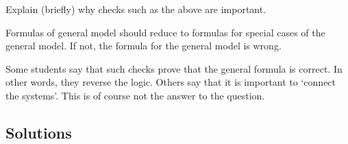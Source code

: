 \begin{exercise}[201904, 1]
  Explain (briefly) why checks such as the above are important.
\begin{solution}
    Formulas of general model should reduce to formulas for special cases of the general model. If not, the formula for the general model is wrong.

    Some students say that such checks prove that the general formula is correct.
    In other words, they reverse the logic.
    Others say that it is important to `connect the systems'.
    This is of course not the answer to the question.
\end{solution}
\end{exercise}



\subsection*{Solutions}




